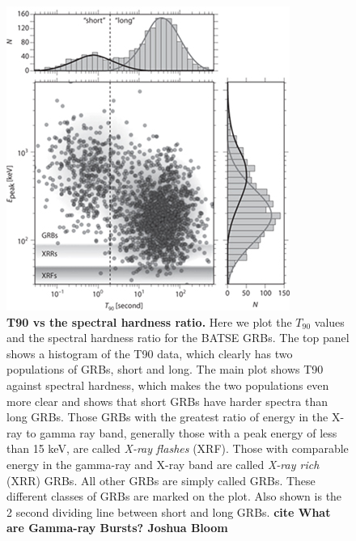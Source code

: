 \documentclass[11pt]{cuthesis}
\begin{document}
\begin{figure} %
\begin{center}
\includegraphics[width=0.8\linewidth]{t90_vs_hardness_new.jpg}
\end{center}
\caption{\textbf{T90 vs the spectral hardness ratio.} Here we plot the $T_{90}$ values and the spectral hardness ratio for the BATSE GRBs. The top panel shows a histogram of the T90 data, which clearly has two populations of GRBs, short and long. The main plot shows T90 against spectral hardness, which makes the two populations even more clear and shows that short GRBs have harder spectra than long GRBs. Those GRBs with the greatest ratio of energy in the X-ray to gamma ray band, generally those with a peak energy of less than 15 keV, are called \textit{X-ray flashes} (XRF). Those with comparable energy in the gamma-ray and X-ray band are called \textit{X-ray rich} (XRR) GRBs. All other GRBs are simply called GRBs. These different classes of GRBs are marked on the plot. Also shown is the 2 second dividing line between short and long GRBs.  \textbf{cite What are Gamma-ray Bursts? Joshua Bloom}}
\label{fig:t90 vs hardness}
\end{figure}
\end{document}
